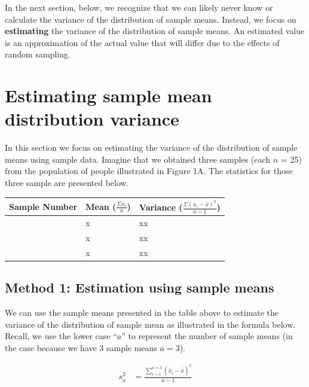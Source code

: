\documentclass[
]{krantz}
\begin{document}
In the next section, below, we recognize that we can likely never know or calculate the variance of the distribution of sample means. Instead, we focus on \textbf{estimating} the variance of the distribution of sample means. An estimated value is an approximation of the actual value that will differ due to the effects of random sampling.

\hypertarget{estimating-sample-mean-distribution-variance}{%
\section{Estimating sample mean distribution variance}\label{estimating-sample-mean-distribution-variance}}

In this section we focus on estimating the variance of the distribution of sample means using sample data. Imagine that we obtained three samples (each \(n\) = 25) from the population of people illustrated in Figure 1A. The statistics for those three sample are presented below.

\begin{longtable}[]{@{}
  >{\centering\arraybackslash}p{}
  >{\centering\arraybackslash}p{}
  >{\centering\arraybackslash}p{}@{}}
\toprule
Sample Number & Mean (\(\frac{\Sigma x_i}{n}\)) & Variance (\(\frac{\Sigma (x_i - \bar{x})^2}{n-1}\)) \\
\midrule
\endhead
1 & x & xx \\
2 & x & xx \\
3 & x & xx \\
\bottomrule
\end{longtable}

\hypertarget{method-1-estimation-using-sample-means}{%
\subsection{Method 1: Estimation using sample means}\label{method-1-estimation-using-sample-means}}

We can use the sample means presented in the table above to estimate the variance of the distribution of sample mean as illustrated in the formula below. Recall, we use the lower case ``\(a\)'' to represent the number of sample means (in the case because we have 3 sample means \(a = 3\)).

\[
\begin{aligned} 
s_{\bar{x}}^2 &= \frac{\sum_{i=1}^{a=3}{(\bar{x}_i - \bar{\bar{x}})^2}}{a-1}\\
\end{aligned} 
\]
\end{document}
